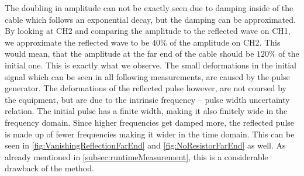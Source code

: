 \documentclass[a4paper,10pt,twocolumn]{article}
\begin{document}
    The doubling in amplitude can not be exactly seen due to damping inside of the cable which follows an exponential decay, but the damping can be approximated.
    By looking at CH2 and comparing the amplitude to the reflected wave on CH1, we approximate the reflected wave to be $40\%$ of the amplitude on CH2.
    This would mean, that the amplitude at the far end of the cable should be $120\%$ of the initial one.
    This is exactly what we observe.
    The small deformations in the initial signal which can be seen in all following measurements, are caused by the pulse generator.
    The deformations of the reflected pulse however, are not coursed by the equipment, but are due to the intrinsic frequency -- pulse width uncertainty relation.
    The initial pulse has a finite width, making it also finitely wide in the frequency domain.
    Since higher frequencies get damped more, the reflected pulse is made up of fewer frequencies making it wider in the time domain.
    This can be seen in \autoref{fig:VanishingReflectionFarEnd} and \autoref{fig:NoResistorFarEnd} as well.
    As already mentioned in \autoref{subsec:runtimeMeasurement}, this is a considerable drawback of the method.
    
\end{document}
